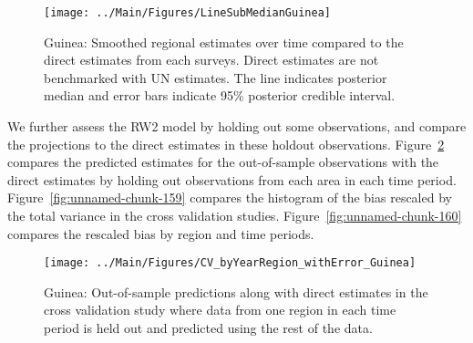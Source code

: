 \documentclass[12pt]{article}\usepackage[]{graphicx}\usepackage[]{color}
\newenvironment{knitrout}{}{} %
\begin{document}
\begin{knitrout}
\color{fgcolor}\begin{figure}[bht]

{\centering \texttt{[image: ../Main/Figures/LineSubMedianGuinea]} 

}

\caption[Guinea]{Guinea: Smoothed regional estimates over time compared to the direct estimates from each surveys. Direct estimates are not benchmarked with UN estimates. The line indicates posterior median and error bars indicate 95\% posterior credible interval.}\label{fig:unnamed-chunk-157}
\end{figure}


\end{knitrout}
We further assess the RW2 model by holding out some observations, and compare the projections to the direct estimates in these holdout observations. Figure~\ref{fig:unnamed-chunk-158} compares the predicted estimates for the out-of-sample observations  with the direct estimates by holding out observations from each area in each time period.  Figure~\ref{fig:unnamed-chunk-159} compares the histogram of the bias rescaled by the total variance in the cross validation studies. Figure~\ref{fig:unnamed-chunk-160} compares the rescaled bias by region and time periods.



 
\begin{knitrout}
\color{fgcolor}\begin{figure}[bht]

{\centering \texttt{[image: ../Main/Figures/CV\_byYearRegion\_withError\_Guinea]} 

}

\caption[Guinea]{Guinea: Out-of-sample predictions along with direct estimates in the cross validation study where data from one region in each time period is held out and predicted using the rest of the data.}\label{fig:unnamed-chunk-158}
\end{figure}


\end{knitrout}
\end{document}
